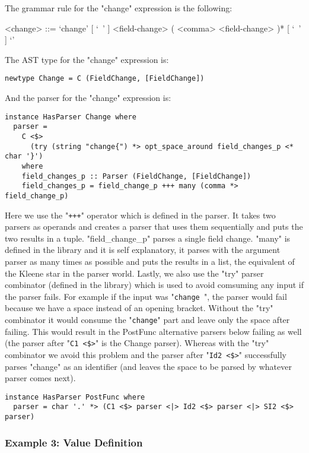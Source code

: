 \documentclass{article}
\begin{document}
The grammar rule for the "change" expression is the following:
\begin{grammar}
<change> ::=
`change{' [ `\ ' ] <field-change> ( <comma> <field-change> )* [ `\ ' ] `}'
\\
\end{grammar}
The AST type for the "change" expression is:
\begin{verbatim}
newtype Change = C (FieldChange, [FieldChange])

\end{verbatim}
And the parser for the "change" expression is:
\begin{verbatim}
instance HasParser Change where
  parser = 
    C <$>
      (try (string "change{") *> opt_space_around field_changes_p <* char '}')
    where
    field_changes_p :: Parser (FieldChange, [FieldChange])
    field_changes_p = field_change_p +++ many (comma *> field_change_p)

\end{verbatim}
Here we use the "\texttt{+++}" operator which is defined in the parser. It
takes two parsers as operands and creates a parser that uses them sequentially
and puts the two results in a tuple. "field_change_p" parses a single field
change. "many" is defined in the library and it is self explanatory, it parses
with the argument parser as many times as possible and puts the results in a
list, the equivalent of the Kleene star in the parser world.  Lastly, we also
use the "try" parser combinator (defined in the library) which is used to avoid
comsuming any input if the parser fails. For example if the input was
"\texttt{change }", the parser would fail because we have a space instead of an
opening bracket.  Without the "try" combinator it would consume the
"\texttt{change}" part and leave only the space after failing. This would
result in the PostFunc alternative parsers below failing as well (the parser
after "\texttt{C1 <\$>}" is the Change parser). Whereas with the "try"
combinator we avoid this problem and the parser after "\texttt{Id2 <\$>}"
successfully parses "change" as an identifier (and leaves the space to be
parsed by whatever parser comes next).

\begin{verbatim}
instance HasParser PostFunc where
  parser = char '.' *> (C1 <$> parser <|> Id2 <$> parser <|> SI2 <$> parser)
\end{verbatim}


\subsubsection{Example 3: Value Definition}
\end{document}
